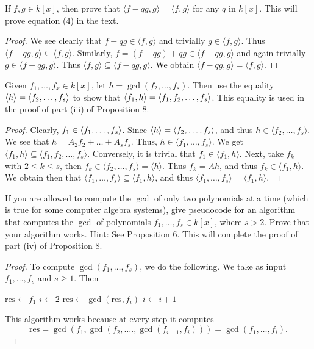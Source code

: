\begin{exercise}{5}
If $f,g\in k[x]$, then prove that $\langle f-qg, g\rangle = \langle f,g\rangle$ for any $q$ in $k[x]$. This will prove equation (4) in the text.
\end{exercise}
\begin{proof}
    We see clearly that $f-qg \in \langle f,g\rangle$ and trivially $g\in \langle f,g\rangle$. Thus $\langle f-qg,g\rangle \subseteq \langle f,g\rangle$. Similarly, $f = (f-qg) + qg\in \langle f-qg,g\rangle$ and again trivially $g\in \langle f-qg,g\rangle$. Thus $\langle f,g\rangle\subseteq \langle f-qg,g\rangle$. We obtain $\langle f-qg,g\rangle = \langle f,g\rangle$.
\end{proof}

\begin{exercise}{6}
Given $f_1,\dots,f_x\in k[x]$, let $h=\gcd(f_2,\dots,f_s)$. Then use the equality $\langle h\rangle = \langle f_2,\dots,f_s\rangle$ to show that $\langle f_1,h\rangle = \langle f_1,f_2,\dots,f_s\rangle$. This equality is used in the proof of part (iii) of Proposition 8.
\end{exercise}
\begin{proof}
Clearly, $f_1\in \langle f_1,\dots,f_s\rangle$. Since $\langle h\rangle = \langle f_2,\dots,f_s\rangle$, and thus $h\in \langle f_2,\dots,f_s\rangle$. We see that $h = A_2 f_2 + \dots + A_s f_s$. Thus, $h\in \langle f_1,\dots,f_s\rangle$. We get $\langle f_1,h\rangle\subseteq \langle f_1,f_2,\dots,f_s\rangle$. Conversely, it is trivial that $f_1\in \langle f_1,h\rangle$. Next, take $f_k$ with $2\leq k\leq s$, then $f_k\in \langle f_2,\dots,f_s\rangle = \langle h\rangle$. Thus $f_k = Ah$, and thus $f_k\in\langle f_1,h\rangle$. We obtain then that $\langle f_1,\dots,f_s\rangle \subseteq \langle f_1,h\rangle$, and thus $\langle f_1,\dots,f_s\rangle = \langle f_1,h\rangle$.
\end{proof}

\begin{exercise}{7}
If you are allowed to compute the $\gcd$ of only two polynomials at a time (which is true for some computer algebra systems), give pseudocode for an algorithm that computes the $\gcd$ of polynomials $f_1,\dots,f_s\in k[x]$, where $s>2$. Prove that your algorithm works. Hint: See Proposition 6. This will complete the proof of part (iv) of Proposition 8.
\end{exercise}
\begin{proof}
To compute $\gcd(f_1,\dots,f_s)$, we do the following. We take as input $f_1,\dots,f_s$ and $s\geq 1$. Then
\begin{center}
\begin{algorithmic}
\STATE $\text{res}\gets f_1$
\STATE $i\gets 2$
    \STATE $\text{res}\gets \gcd(\text{res}, f_i)$
    \STATE $i\gets i+1$
\ENDWHILE
\end{algorithmic}
\end{center}
This algorithm works because at every step it computes
$$\text{res} = \gcd(f_1,\gcd(f_2,\dots.,\gcd(f_{i-1},f_i))) = \gcd(f_1,\dots,f_i).$$
\end{proof}

